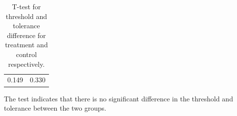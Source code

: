 \begin{longtable} {c|c}
	\caption{T-test for threshold and tolerance difference for treatment and control respectively.}	\label{tab:T-test1} \\
 \cellcolor[HTML]{C0C0C0}{\textbf{Threshold Difference}} &  \cellcolor[HTML]{C0C0C0}{\textbf{Tolerance Difference}}	\\ \hline
0.149 & 0.330  \\ \hline

\end{longtable}
\vspace{-.5cm}


The test indicates that there is no significant difference in the threshold and tolerance between the two groups. 


%
%
%
% 


